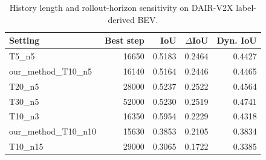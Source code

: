 \begin{table}[t]
\centering
\scriptsize
\caption{History length and rollout-horizon sensitivity on DAIR-V2X label-derived BEV.}
\label{tab:dair-sensitivity}
\begin{tabular}{lrrrr}
\toprule
Setting & Best step & IoU & $\Delta$IoU & Dyn. IoU \\
\midrule
T5\_n5 & 16650 & 0.5183 & 0.2464 & 0.4427 \\
our\_method\_T10\_n5 & 16140 & 0.5164 & 0.2446 & 0.4465 \\
T20\_n5 & 28000 & 0.5237 & 0.2522 & 0.4564 \\
T30\_n5 & 52000 & 0.5230 & 0.2519 & 0.4741 \\
T10\_n3 & 16350 & 0.5954 & 0.2229 & 0.4318 \\
our\_method\_T10\_n10 & 15630 & 0.3853 & 0.2105 & 0.3834 \\
T10\_n15 & 29000 & 0.3065 & 0.1722 & 0.3385 \\
\bottomrule
\end{tabular}
\end{table}
